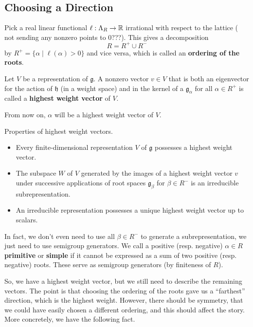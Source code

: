 \documentclass[12pt]{article}
\newcommand{\fg}{\mathfrak{g}}
\newcommand{\fh}{\mathfrak{h}}
\begin{document}
\subsection{Choosing a Direction}
Pick a real linear functional $\ell: \Lambda_R \to \mathbb{R}$ irrational with respect to the lattice ({\color{red} not sending any nonzero points to 0???}). This gives a decomposition
\[R = R^+ \cup R^-\]
by $R^+ = \{\alpha \mid \ell(\alpha)>0\}$ and vice versa, which is called an \textbf{ordering of the roots}.

\begin{defn}
    Let $V$ be a representation of $\fg$. A nonzero vector $v\in V$ that is both an eigenvector for the action of $\fh$ (in a weight space) and in the kernel of a $\fg_\alpha$ for all $\alpha \in R^+$ is called a \textbf{highest weight vector} of $V$.
\end{defn}

From now on, $\alpha$ will be a highest weight vector of $V$.

\begin{prop}
    Properties of highest weight vectors.
    \begin{itemize}
        \item Every finite-dimensional representation $V$ of $\fg$ possesses a highest weight vector.
        \item The subspace $W$ of $V$ generated by the images of a highest weight vector $v$ under successive applications of root spaces $\fg_\beta$ for $\beta \in R^-$ is an irreducible subrepresentation.
        \item An irreducible representation possesses a unique highest weight vector up to scalars.
    \end{itemize}
\end{prop}

In fact, we don't even need to use all $\beta\in R^-$ to generate a subrepresentation, we just need to use semigroup generators. We call a positive (resp. negative) $\alpha\in R$ \textbf{primitive} or \textbf{simple} if it cannot be expressed as a sum of two positive (resp. negative) roots. These serve as semigroup generators (by finiteness of $R$).

So, we have a highest weight vector, but we still need to describe the remaining vectors. The point is that choosing the ordering of the roots gave us a ``farthest'' direction, which is the highest weight. However, there should be symmetry, that we could have easily chosen a different ordering, and this should affect the story. More concretely, we have the following fact.
\end{document}
